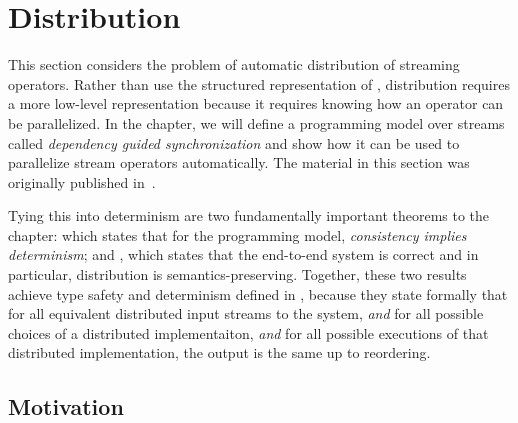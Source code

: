 \chapter{Distribution}
\label{cha:distribution}

This section considers the problem of automatic distribution of streaming operators.
Rather than use the structured representation of ,
distribution requires a more low-level representation because it requires knowing how an operator can be parallelized.
In the chapter, we will define a programming model over streams called \emph{dependency guided synchronization} and show how it can be used to parallelize stream operators automatically.
The material in this section was originally published in~.

Tying this into determinism are two fundamentally important theorems to the chapter:  which states that for the programming model, \emph{consistency implies determinism}; and , which states that the end-to-end system is correct and in particular, distribution is semantics-preserving.
Together, these two results achieve type safety and determinism defined in ,
because they state formally that for all equivalent distributed input streams to the system, \emph{and} for all possible choices of a distributed implementaiton, \emph{and} for all possible executions of that distributed implementation, the output is the same up to reordering.

\section{Motivation}

